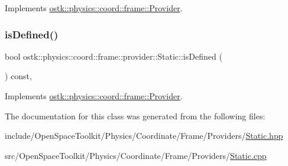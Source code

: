 Implements \hyperlink{classostk_1_1physics_1_1coord_1_1frame_1_1_provider_a38b86a589f46f8b8a9c97ab2776f37d1}{ostk\+::physics\+::coord\+::frame\+::\+Provider}.

\mbox{\label{classostk_1_1physics_1_1coord_1_1frame_1_1provider_1_1_static_a5b7189d8cff8128fee348af2feac1304}} 
\subsubsection{\texorpdfstring{is\+Defined()}{isDefined()}}
{\footnotesize\ttfamily bool ostk\+::physics\+::coord\+::frame\+::provider\+::\+Static\+::is\+Defined (\begin{DoxyParamCaption}{ }\end{DoxyParamCaption}) const\hspace{0.3cm}{\ttfamily [override]}, {\ttfamily [virtual]}}



Implements \hyperlink{classostk_1_1physics_1_1coord_1_1frame_1_1_provider_a27acab0012649796b97956fed1a91493}{ostk\+::physics\+::coord\+::frame\+::\+Provider}.



The documentation for this class was generated from the following files\+:\begin{DoxyCompactItemize}
\item 
include/\+Open\+Space\+Toolkit/\+Physics/\+Coordinate/\+Frame/\+Providers/\hyperlink{_static_8hpp}{Static.\+hpp}\item 
src/\+Open\+Space\+Toolkit/\+Physics/\+Coordinate/\+Frame/\+Providers/\hyperlink{_static_8cpp}{Static.\+cpp}\end{DoxyCompactItemize}
